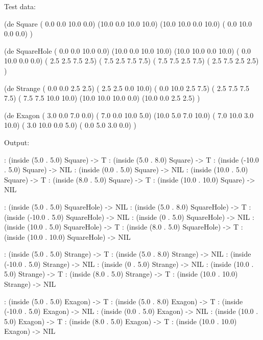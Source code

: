 \begin{wideverbatim}

Test data:

(de Square
   ( 0.0  0.0  10.0  0.0)
   (10.0  0.0  10.0 10.0)
   (10.0 10.0   0.0 10.0)
   ( 0.0 10.0   0.0  0.0) )

(de SquareHole
   ( 0.0  0.0  10.0  0.0)
   (10.0  0.0  10.0 10.0)
   (10.0 10.0   0.0 10.0)
   ( 0.0 10.0   0.0  0.0)
   ( 2.5  2.5   7.5  2.5)
   ( 7.5  2.5   7.5  7.5)
   ( 7.5  7.5   2.5  7.5)
   ( 2.5  7.5   2.5  2.5) )

(de Strange
   ( 0.0  0.0   2.5  2.5)
   ( 2.5  2.5   0.0 10.0)
   ( 0.0 10.0   2.5  7.5)
   ( 2.5  7.5   7.5  7.5)
   ( 7.5  7.5  10.0 10.0)
   (10.0 10.0  10.0  0.0)
   (10.0  0.0   2.5  2.5) )

(de Exagon
   ( 3.0  0.0   7.0  0.0)
   ( 7.0  0.0  10.0  5.0)
   (10.0  5.0   7.0 10.0)
   ( 7.0 10.0   3.0 10.0)
   ( 3.0 10.0   0.0  5.0)
   ( 0.0  5.0   3.0  0.0) )


Output:

: (inside (5.0 . 5.0) Square)
-> T
: (inside (5.0 . 8.0) Square)
-> T
: (inside (-10.0 . 5.0) Square)
-> NIL
: (inside (0.0 . 5.0) Square)
-> NIL
: (inside (10.0 . 5.0) Square)
-> T
: (inside (8.0 . 5.0) Square)
-> T
: (inside (10.0 . 10.0) Square)
-> NIL

\end{wideverbatim}

\begin{wideverbatim}

: (inside (5.0 . 5.0) SquareHole)
-> NIL
: (inside (5.0 . 8.0) SquareHole)
-> T
: (inside (-10.0 . 5.0) SquareHole)
-> NIL
: (inside (0 . 5.0) SquareHole)
-> NIL
: (inside (10.0 . 5.0) SquareHole)
-> T
: (inside (8.0 . 5.0) SquareHole)
-> T
: (inside (10.0 . 10.0) SquareHole)
-> NIL

: (inside (5.0 . 5.0) Strange)
-> T
: (inside (5.0 . 8.0) Strange)
-> NIL
: (inside (-10.0 . 5.0) Strange)
-> NIL
: (inside (0 . 5.0) Strange)
-> NIL
: (inside (10.0 . 5.0) Strange)
-> T
: (inside (8.0 . 5.0) Strange)
-> T
: (inside (10.0 . 10.0) Strange)
-> NIL

: (inside (5.0 . 5.0) Exagon)
-> T
: (inside (5.0 . 8.0) Exagon)
-> T
: (inside (-10.0 . 5.0) Exagon)
-> NIL
: (inside (0.0 . 5.0) Exagon)
-> NIL
: (inside (10.0 . 5.0) Exagon)
-> T
: (inside (8.0 . 5.0) Exagon)
-> T
: (inside (10.0 . 10.0) Exagon)
-> NIL

\end{wideverbatim}

